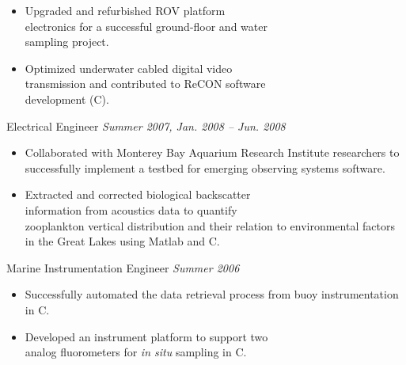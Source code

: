 \documentclass{article}
\begin{document}
{\begin{multicols}{2}
                \begin{itemize}[noitemsep,nolistsep]
                	\item Upgraded and refurbished ROV platform \\electronics for a successful ground-floor and water \\sampling project.
                	\item Optimized underwater cabled digital video \\transmission and contributed to ReCON software \\development (C).
                \end{itemize}
                \vspace{5px}
                Electrical Engineer  \hfill \textsl{Summer 2007, Jan. 2008 -- Jun. 2008}  \\
                \vspace{ -10px}	
                \begin{itemize}[noitemsep,nolistsep]
                	\item Collaborated with Monterey Bay Aquarium Research Institute researchers to successfully implement a testbed for emerging observing systems software.
                	\item Extracted and corrected biological backscatter \\information from acoustics data to quantify \\zooplankton vertical distribution and their relation to environmental factors in the Great Lakes using Matlab and C.
                \end{itemize}
                \vspace{5px}
                Marine Instrumentation Engineer \hfill \textsl{Summer 2006} \\
                \vspace{ -10px}	
                \begin{itemize}[noitemsep,nolistsep]
                	\item Successfully automated the data retrieval process from buoy instrumentation in C. 
                	\item Developed an instrument platform to support two \\analog fluorometers for \textit{in situ} sampling in C. 
                \end{itemize}
                \vspace{5px}

\end{multicols}}
\end{document}
